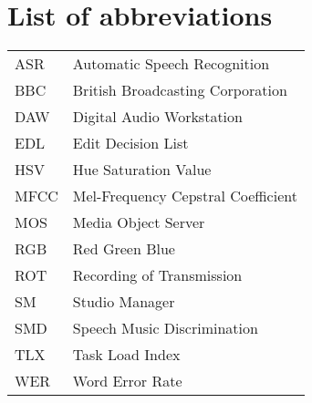 \chapter*{List of abbreviations}

\begin{tabular}{l l}
ASR & Automatic Speech Recognition \\
BBC & British Broadcasting Corporation \\
DAW & Digital Audio Workstation \\
EDL & Edit Decision List \\
HSV & Hue Saturation Value \\
MFCC & Mel-Frequency Cepstral Coefficient \\
MOS & Media Object Server \\
RGB & Red Green Blue \\
ROT & Recording of Transmission \\
SM  & Studio Manager \\
SMD & Speech Music Discrimination \\
TLX & Task Load Index \\
WER & Word Error Rate
\end{tabular}
